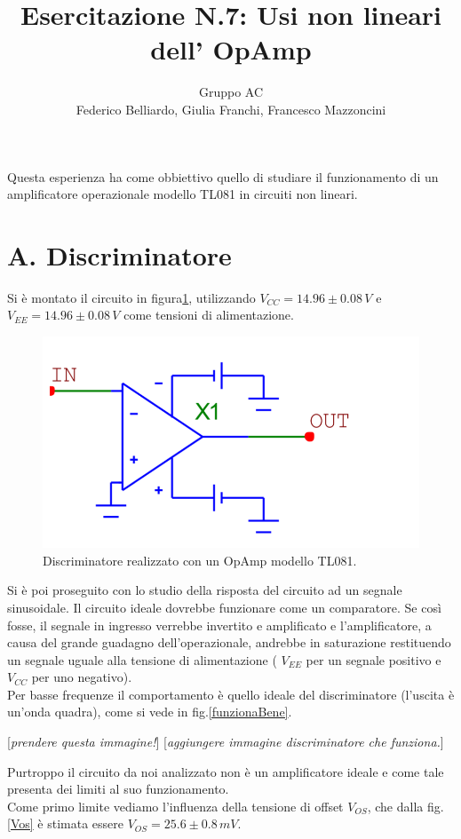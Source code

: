 \documentclass[10pt,a4paper]{article}
\author{Gruppo AC \\ Federico Belliardo, Giulia Franchi, Francesco Mazzoncini}
\title{Esercitazione N.7: Usi non lineari dell’ OpAmp}
\newcommand{\rem}[1]{[\emph{#1}]}
\begin{document}
\maketitle
Questa esperienza ha come obbiettivo quello di studiare il funzionamento di un amplificatore operazionale modello TL081 in circuiti non lineari.

\section*{A. Discriminatore}

Si è montato il circuito in figura\ref{circuito1}, utilizzando $V_{CC} = 14.96\pm0.08 \, V$ e $V_{EE} = 14.96 \pm 0.08 \, V$ come tensioni di alimentazione.

\begin{figure}[h]
\centering
\includegraphics[scale=0.5]{Discriminatore.png}
\caption{Discriminatore realizzato con un OpAmp modello TL081.}
\label{circuito1}
\end{figure}

Si è poi proseguito con lo studio della risposta del circuito ad un segnale sinusoidale. Il circuito ideale dovrebbe funzionare come un comparatore. Se così fosse, il segnale in ingresso verrebbe invertito e amplificato e l'amplificatore, a causa del grande guadagno dell'operazionale, andrebbe in saturazione restituendo un segnale uguale alla tensione di alimentazione ( $V_{EE}$ per un segnale positivo e $V_{CC}$ per uno negativo).\\
Per basse frequenze il comportamento è quello ideale del discriminatore (l'uscita è un'onda quadra), come si vede in fig.\ref{funzionaBene}.

\rem{prendere questa immagine!}
\rem{aggiungere immagine discriminatore che funziona.}

Purtroppo il circuito da noi analizzato non è un amplificatore ideale e come tale presenta dei limiti al suo funzionamento.\\
Come primo limite vediamo l'influenza della tensione di offset $V_{OS}$, che dalla fig.\ref{Vos} è stimata essere $V_{OS} = 25.6 \pm 0.8 \, mV$.\\
\end{document}
